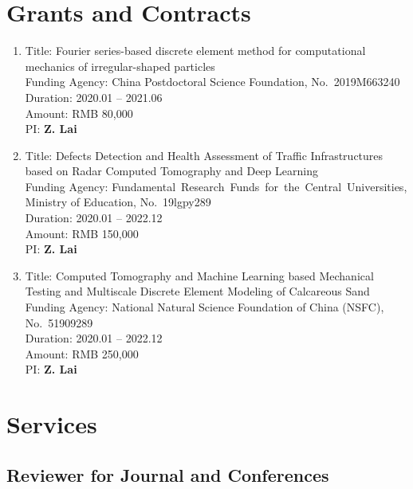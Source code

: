 \documentclass[11pt,]{elsarticle}
\begin{document}
\hypertarget{grants-and-contracts}{%
\section{Grants and Contracts}\label{grants-and-contracts}}

\begin{enumerate}
\def\labelenumi{\arabic{enumi}.}
\item
  Title: Fourier series-based discrete element method for computational
  mechanics of irregular-shaped particles\\
  Funding Agency: China Postdoctoral Science Foundation,
  No.~2019M663240\\
  Duration: 2020.01 -- 2021.06\\
  Amount: RMB 80,000\\
  PI: \textbf{Z. Lai}
\item
  Title: Defects Detection and Health Assessment of Traffic
  Infrastructures based on Radar Computed Tomography and Deep Learning\\
  Funding Agency:
  Fundamental~Research~Funds~for~the~Central~Universities, Ministry of
  Education, No.~19lgpy289\\
  Duration: 2020.01 -- 2022.12\\
  Amount: RMB 150,000\\
  PI: \textbf{Z. Lai}
\item
  Title: Computed Tomography and Machine Learning based Mechanical
  Testing and Multiscale Discrete Element Modeling of Calcareous Sand\\
  Funding Agency: National Natural Science Foundation of China (NSFC),
  No.~51909289\\
  Duration: 2020.01 -- 2022.12\\
  Amount: RMB 250,000\\
  PI: \textbf{Z. Lai}
\end{enumerate}

\hypertarget{services}{%
\section{Services}\label{services}}

\hypertarget{reviewer-for-journal-and-conferences}{%
\subsection{Reviewer for Journal and
Conferences}\label{reviewer-for-journal-and-conferences}}
\end{document}
